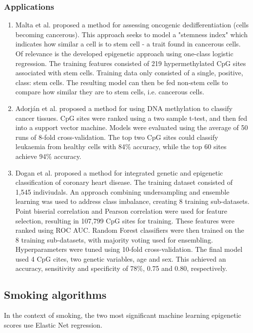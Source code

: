 \documentclass{article}
\begin{document}
\subsubsection{Applications} \label{sec:ml-examples}
\begin{enumerate}
    \item Malta et al. \cite{malta2018machine} proposed a method for assessing oncogenic dedifferentiation (cells becoming cancerous). This approach seeks to model a "stemness index" which indicates how similar a cell is to stem cell - a trait found in cancerous cells. Of relevance is the developed epigenetic approach using one-class logistic regression. The training features consisted of 219 hypermethylated CpG sites associated with stem cells. Training data only consisted of a single, positive, class: stem cells. The resulting model can then be fed non-stem cells to compare how similar they are to stem cells, i.e. cancerous cells.

    \item Adorj\'an et al. \cite{adorjan2002tumour} proposed a method for using DNA methylation to classify cancer tissues. CpG sites were ranked using a two sample t-test, and then fed into a support vector machine. Models were evaluated using the average of 50 runs of 8-fold cross-validation. The top two CpG sites could classify leukaemia from healthy cells with 84\% accuracy, while the top 60 sites achieve 94\% accuracy.

    \item Dogan et al. \cite{dogan2018integrated} proposed a method for integrated genetic and epigenetic classification of coronary heart disease. The training dataset consisted of 1,545 indiviudals. An approach combining undersampling and ensemble learning \cite{liu2008exploratory} was used to address class imbalance, creating 8 training sub-datasets. Point biserial correlation and Pearson correlation were used for feature selection, resulting in 107,799 CpG sites for training. These features were ranked using ROC AUC. Random Forest classifiers were then trained on the 8 training sub-datasets, with majority voting used for ensembling. Hyperparameters were tuned using 10-fold cross-validation. The final model used 4 CpG cites, two genetic variables, age and sex. This achieved an accuracy, sensitivity and specificity of 78\%, 0.75 and 0.80, respectively.
\end{enumerate}

\subsection{Smoking algorithms}
In the context of smoking, the two most significant machine learning epigenetic scores use Elastic Net regression.
\end{document}
